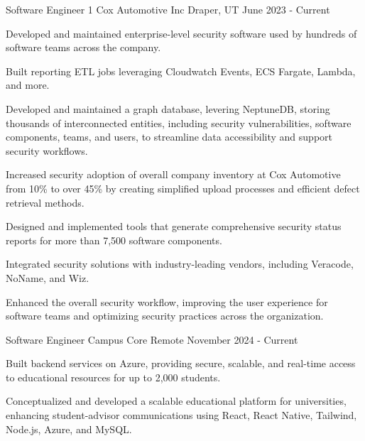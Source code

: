 


\begin{cventries}


\cventry
{Software Engineer 1} %
{Cox Automotive Inc} %
{Draper, UT} %
{June 2023 - Current} %
{ %
\begin{cvitems}
\item {Developed and maintained enterprise-level security software used by hundreds of software teams across the company.}
\item {Built reporting ETL jobs leveraging Cloudwatch Events, ECS Fargate, Lambda, and more.}
\item {Developed and maintained a graph database, levering NeptuneDB, storing thousands of interconnected entities, including security vulnerabilities, software components, teams, and users, to streamline data accessibility and support security workflows.}
\item {Increased security adoption of overall company inventory at Cox Automotive from 10\% to over 45\% by creating simplified upload processes and efficient defect retrieval methods.}
\item {Designed and implemented tools that generate comprehensive security status reports for more than 7,500 software components.}
\item {Integrated security solutions with industry-leading vendors, including Veracode, NoName, and Wiz.}
\item {Enhanced the overall security workflow, improving the user experience for software teams and optimizing security practices across the organization.}
\end{cvitems}
}


\cventry
{Software Engineer} %
{Campus Core} %
{Remote} %
{November 2024 - Current} %
{ %
\begin{cvitems}
\item {Built backend services on Azure, providing secure, scalable, and real-time access to educational resources for up to 2,000 students.}
\item {Conceptualized and developed a scalable educational platform for universities, enhancing student-advisor communications using React, React Native, Tailwind, Node.js, Azure, and MySQL.}
\end{cvitems}
}


\end{cventries}
